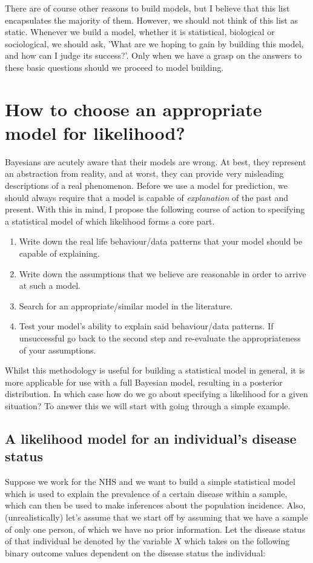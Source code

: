 \documentclass[11pt,fullpage]{book}
\begin{document}
There are of course other reasons to build models, but I believe that this list encapsulates the majority of them. However, we should not think of this list as static. Whenever we build a model, whether it is statistical, biological or sociological, we should ask, 'What are we hoping to gain by building this model, and how can I judge its success?'. Only when we have a grasp on the answers to these basic questions should we proceed to model building.

\section{How to choose an appropriate model for likelihood?}\label{sec:chooseLikelihood}
Bayesians are acutely aware that their models are wrong. At best, they represent an abstraction from reality, and at worst, they can provide very misleading descriptions of a real phenomenon. Before we use a model for prediction, we should always require that a model is capable of \textit{explanation} of the past and present. With this in mind, I propose the following course of action to specifying a statistical model of which likelihood forms a core part.

\begin{enumerate}
\item Write down the real life behaviour/data patterns that your model should be capable of explaining.
\item Write down the assumptions that we believe are reasonable in order to arrive at such a model.
\item Search for an appropriate/similar model in the literature.
\item Test your model's ability to explain said behaviour/data patterns. If unsuccessful go back to the second step and re-evaluate the appropriateness of your assumptions.
\end{enumerate}

Whilst this methodology is useful for building a statistical model in general, it is more applicable for use with a full Bayesian model, resulting in a posterior distribution. In which case how do we go about specifying a likelihood for a given situation? To answer this we will start with going through a simple example.

\subsection{A likelihood model for an individual's disease status}\label{sec:Likelihood_individualDisease}
Suppose we work for the NHS and we want to build a simple statistical model which is used to explain the prevalence of a certain disease within a sample, which can then be used to make inferences about the population incidence. Also, (unrealistically) let's assume that we start off by assuming that we have a sample of only one person, of which we have no prior information. Let the disease status of that individual be denoted by the variable $X$ which takes on the following binary outcome values dependent on the disease status the individual:
\end{document}

